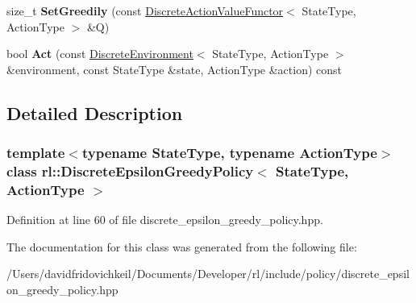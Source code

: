 \begin{DoxyCompactItemize}
size\+\_\+t {\bfseries Set\+Greedily} (const \hyperlink{structrl_1_1_discrete_action_value_functor}{Discrete\+Action\+Value\+Functor}$<$ State\+Type, Action\+Type $>$ \&Q)
\item 
\hypertarget{classrl_1_1_discrete_epsilon_greedy_policy_a54e5c8fa9e5f473cfc1dd240c779728e}{}\label{classrl_1_1_discrete_epsilon_greedy_policy_a54e5c8fa9e5f473cfc1dd240c779728e} 
bool {\bfseries Act} (const \hyperlink{classrl_1_1_discrete_environment}{Discrete\+Environment}$<$ State\+Type, Action\+Type $>$ \&environment, const State\+Type \&state, Action\+Type \&action) const
\end{DoxyCompactItemize}


\subsection{Detailed Description}
\subsubsection*{template$<$typename State\+Type, typename Action\+Type$>$\newline
class rl\+::\+Discrete\+Epsilon\+Greedy\+Policy$<$ State\+Type, Action\+Type $>$}



Definition at line 60 of file discrete\+\_\+epsilon\+\_\+greedy\+\_\+policy.\+hpp.



The documentation for this class was generated from the following file\+:\begin{DoxyCompactItemize}
\item 
/\+Users/davidfridovichkeil/\+Documents/\+Developer/rl/include/policy/discrete\+\_\+epsilon\+\_\+greedy\+\_\+policy.\+hpp\end{DoxyCompactItemize}
